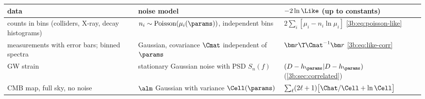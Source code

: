 \begin{taxonomy}
\small
\begin{tabular}{@{}>{\raggedright\arraybackslash}p{3.3cm}>{\raggedright\arraybackslash}p{4.4cm}>{\raggedright\arraybackslash}p{5.0cm}@{}}
  data & noise model & $-2\ln\Like$ (up to constants)\\
  \hline
  counts in bins (colliders, X-ray, decay histograms)
    & $n_i\sim\mathrm{Poisson}(\mu_i(\params))$, independent bins
    & $2\sum_i[\mu_i-n_i\ln\mu_i]$ \eqref{3b:eq:poisson-like}\\[2pt]
  measurements with error bars; binned spectra
    & Gaussian, covariance $\Cmat$ independent of $\params$
    & $\bm r\T\Cmat^{-1}\bm r$ \eqref{3b:eq:like-corr}\\[2pt]
  GW strain
    & stationary Gaussian noise with PSD $S_n(f)$
    & $(D-h_{\params}|D-h_{\params})$ (\cref{3b:sec:correlated})\\[2pt]
  CMB map, full sky, no noise
    & $\alm$ Gaussian with variance $\Cell(\params)$
    & $\sum_\ell(2\ell+1)\bigl[\Chat/\Cell+\ln\Cell\bigr]$\\
\end{tabular}
\end{taxonomy}

